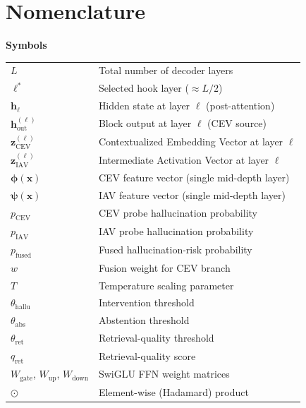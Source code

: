 \clearpage
\setcounter{secnumdepth}{-1}
\section{\hfil Nomenclature \hfil}
\vspace{1cm}
\thispagestyle{front}

\noindent \textbf{Symbols}

\vspace{0.5cm}

\begin{tabular}{@{}l p{11cm}@{}}
$L$                         & Total number of decoder layers \\
$\ell^*$                    & Selected hook layer ($\approx L/2$) \\
$\mathbf{h}_\ell$           & Hidden state at layer $\ell$ (post-attention) \\
$\mathbf{h}_{\text{out}}^{(\ell)}$ & Block output at layer $\ell$ (CEV source) \\
$\mathbf{z}_{\text{CEV}}^{(\ell)}$ & Contextualized Embedding Vector at layer $\ell$ \\
$\mathbf{z}_{\text{IAV}}^{(\ell)}$ & Intermediate Activation Vector at layer $\ell$ \\
$\boldsymbol{\phi}(\mathbf{x})$ & CEV feature vector (single mid-depth layer) \\
$\boldsymbol{\psi}(\mathbf{x})$ & IAV feature vector (single mid-depth layer) \\
$p_{\text{CEV}}$            & CEV probe hallucination probability \\
$p_{\text{IAV}}$            & IAV probe hallucination probability \\
$p_{\text{fused}}$          & Fused hallucination-risk probability \\
$w$                         & Fusion weight for CEV branch \\
$T$                         & Temperature scaling parameter \\
$\theta_{\text{hallu}}$     & Intervention threshold \\
$\theta_{\text{abs}}$       & Abstention threshold \\
$\theta_{\text{ret}}$       & Retrieval-quality threshold \\
$q_{\text{ret}}$            & Retrieval-quality score \\
$W_{\text{gate}}$, $W_{\text{up}}$, $W_{\text{down}}$ & SwiGLU FFN weight matrices \\
$\odot$                     & Element-wise (Hadamard) product \\
\end{tabular}

